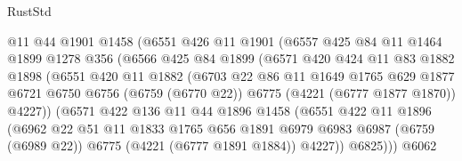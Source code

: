 \begin{lexlean}{RustStd}
\begin{coremodule}
                    @11
                    @44
                    @1901
                    @1458
                    (@6551
                      @426
                      @11
                      @1901
                      (@6557
                        @425
                        @84
                        @11
                        @1464
                        @1899
                        @1278
                        @356
                        (@6566
                          @425
                          @84
                          @1899
                          (@6571
                            @420
                            @424
                            @11
                            @83
                            @1882
                            @1898
                            (@6551
                              @420
                              @11
                              @1882
                              (@6703
                                @22
                                @86
                                @11
                                @1649
                                @1765
                                @629
                                @1877
                                @6721
                                @6750
                                @6756
                                (@6759 (@6770 @22))
                                @6775
                                (@4221 (@6777 @1877 @1870))
                                @4227))
                            (@6571
                              @422
                              @136
                              @11
                              @44
                              @1896
                              @1458
                              (@6551
                                @422
                                @11
                                @1896
                                (@6962
                                  @22
                                  @51
                                  @11
                                  @1833
                                  @1765
                                  @656
                                  @1891
                                  @6979
                                  @6983
                                  @6987
                                  (@6759 (@6989 @22))
                                  @6775
                                  (@4221 (@6777 @1891 @1884))
                                  @4227))
                              @6825)))
                        @6062

\end{coremodule}
\end{lexlean}
